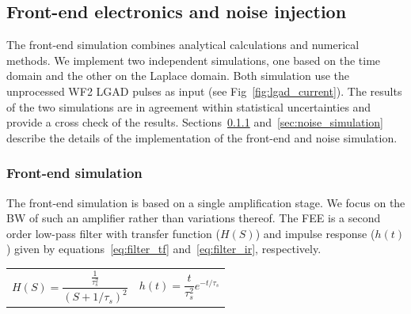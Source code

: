 \documentclass[preprint,1p]{elsarticle}
\begin{document}

\subsection{Front-end electronics and noise injection}
\label{sub_sec:fee_simulation_and_noise} The front-end simulation combines
analytical calculations and numerical methods. We implement two independent
simulations, one based on the time domain and the other on the Laplace domain.
Both simulation use the unprocessed WF2 LGAD pulses as input (see Fig~\ref{fig:lgad_current}).
 The results of the two simulations are in agreement within statistical uncertainties and provide a
cross check of the results. Sections~\ref{sec:fee}
and~\ref{sec:noise_simulation} describe the details of the implementation of the
front-end and noise simulation. %

\subsubsection{Front-end simulation}\label{sec:fee}
The front-end simulation is based on a single amplification stage. We focus on the BW of such an amplifier rather than variations
thereof. The FEE is a second order low-pass filter with transfer function ($H(S)$)
and impulse response ($h(t)$) given by equations~\ref{eq:filter_tf} and~\ref{eq:filter_ir}, respectively.

 \begin{tabularx}{\textwidth}{XX}
 \begin{equation}\label{eq:filter_tf}
   H(S) = \frac{\frac{1}{\tau_{s}^{2}}}{(S+1/\tau_{s})^{2}}
 \end{equation}
     &
 \begin{equation}\label{eq:filter_ir}
     h(t) = \frac{t}{\tau_s^2}e^{-t/\tau_{s}}
 \end{equation}
 \end{tabularx}\par
\end{document}
